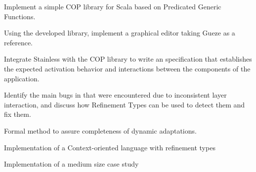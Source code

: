 \documentclass[a4paper,fleqn]{cas-sc}
\begin{document}
\begin{abstract}
~\textbf{Purpose:} Adaptive Systems, realized by \ac{COP}, enable software systems to modify their 
behavior at run time, in response to the execution context. Adaptations occur by means of a 
(de)activation mechanism that dynamically declares the scope of a given functionality. Writing 
programs in a \ac{COP} fashion enhances modularity and expressivity, however, it also poses 
challenges when validating the execution of the program. Testing \ac{COP} programs requires 
programmers to reason about the immense space of possible state values, and how those affect the 
flow of the program by identifying the components that are activated or deactivated at a given point in 
time.
\textbf{Method:} 
There is an ongoing research effort to create tools and frameworks to improve the correctness of 
\ac{COP} programs, however, no usage of software verification tools have been found to date on this 
area. We propose a framework based on Refinement Types to formally verify the consistency and 
completeness of adaptations. 
\textbf{Results:} 
We use a case study of a graphical editor, illustrating how to reason about \ac{COP} programs using 
refinement types, focusing the formulation of properties regarding the interactions between active 
adaptations. The result of this study is a verified assessment of the use of refinement types to validate 
the consistency and completeness of dynamically adaptive systems.
\textbf{Conclusion:} 
With this work we illustrate the benefits of software verification techniques for \ac{COP}, by means of 
Refinement Types.
\end{abstract}


\begin{highlights}
\item Implement a simple \ac{COP} library for Scala based on Predicated Generic Functions.
\item Using the developed library, implement a graphical editor taking Gueze as a reference.
\item Integrate Stainless with the \ac{COP} library to write an specification that establishes the expected activation behavior and interactions between the components of the application.
\item Identify the main bugs in that were encountered due to inconsistent layer interaction, and discuss how Refinement Types can be used to detect them and fix them.
\item Formal method to assure completeness of dynamic adaptations.
\item Implementation of a Context-oriented language with refinement types
\item Implementation of a medium size case study
\end{highlights}
\end{document}
